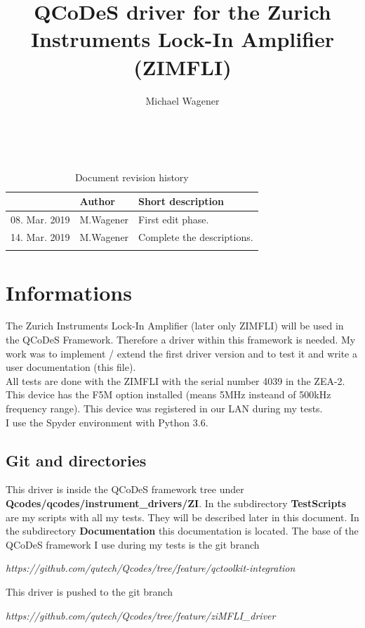 \documentclass[11pt]{article} %
\title{QCoDeS driver for the Zurich Instruments Lock-In Amplifier (ZIMFLI)}
\author{Michael Wagener}
\begin{document}
\maketitle

\tableofcontents %

\ \\

\begin{longtable}{|p{2.7cm}|p{2.6cm}|p{10.3cm}|}
\caption{Document revision history} \\
\hline\rowcolor{rowcolor}{\bf Date} & {\bf Author} & {\bf Short description} \\
\endfirsthead
\hline
08. Mar. 2019 & M.Wagener & First edit phase. \\ \hline
14. Mar. 2019 & M.Wagener & Complete the descriptions. \\ \hline
 &  &  \\ \hline
\end{longtable}


\clearpage

\section{Informations}

The Zurich Instruments Lock-In Amplifier (later only ZIMFLI) will be used in the QCoDeS Framework. Therefore a driver within this framework is needed.
My work was to implement / extend the first driver version and to test it and write a user documentation (this file). \\[0.5em]
%
All tests are done with the ZIMFLI with the serial number 4039 in the ZEA-2. This device has the F5M option installed (means 5MHz insteand of 500kHz frequency range). This device was registered in our LAN during my tests. \\[0.5em]
%
I use the Spyder environment with Python 3.6.

\subsection{Git and directories}

This driver is inside the QCoDeS framework tree under {\bf Qcodes/qcodes/instrument\_drivers/ZI}. In the subdirectory {\bf TestScripts} are my scripts with all my tests. They will be described later in this document. In the subdirectory {\bf Documentation} this documentation is located. The base of the QCoDeS framework I use during my tests is the git branch \\
\centerline{\it https://github.com/qutech/Qcodes/tree/feature/qctoolkit-integration}
This driver is pushed to the git branch \\
\centerline{\it https://github.com/qutech/Qcodes/tree/feature/ziMFLI\_driver}
\end{document}
